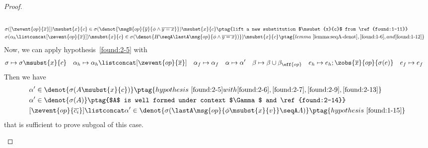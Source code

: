 \begin{proof}
\begin{enumerate}[label=Case]
{\begin{alignat}{2}
\\& \sigma([\zevent{op}{\overline{x}}])\msubst{x}{c} \in \sigma(\denot{\msgB{op}{\overline{y}}{\phi \land \overline{y = x}}})\msubst{x}{c} \ptag{lift a new substitution $\msubst{x}{c}$ from \ref{found:1-11}} \label{found:1-12}
\\& \sigma(\alpha_h \listconcat [\zevent{op}{\overline{x}}])\msubst{x}{c} \in \sigma(\denot{H \seqA \lastA\msg{op}{\phi \land \overline{y = x}})})\msubst{x}{c} \ptag{lemma~\ref{lemma:seqA-denot}, \ref{found:1-6}, and \ref{found:1-12}} \label{found:2-13}
\end{alignat}}\noindent
Now, we can apply hypothesis~\ref{found:2-5} with 
{\footnotesize\begin{align*}
    &\sigma \mapsto \sigma\msubst{x}{c} \quad \alpha_h \mapsto \alpha_h \listconcat [\zevent{op}{\overline{x}}] \quad \alpha_f \mapsto \alpha_f \quad \alpha \mapsto \alpha' \quad \beta \mapsto \beta \cup \beta_{\eff{op}} \quad 
    e_h \mapsto e_h; \zobs{\overline{x}}{op}{\sigma(e)} \quad e_f \mapsto e_f
\end{align*}}
Then we have
{\footnotesize\begin{alignat}{2}
&\alpha' \in\denot{\sigma(A\msubst{x}{c})} \ptag{hypothesis~\ref{found:2-5} with \ref{found:2-6}, \ref{found:2-7}, \ref{found:2-9}, \ref{found:2-13}} \label{found:2-14}
\\&\alpha' \in\denot{\sigma(A)} \ptag{$A$ is well formed under context $\Gamma$ and \ref{found:2-14}} \label{found:1-15}
\\&[\zevent{op}{\overline{c_i}}] \listconcat \alpha' \in\denot{\sigma(\lastA\msg{op}{\phi\msubst{x}{v}} \seqA A)}\ptag{hypothesis~\ref{found:1-15}} \label{found:1-16}
\end{alignat}}\noindent
that is sufficient to prove subgoal of this case.


\end{enumerate}
\end{proof}
